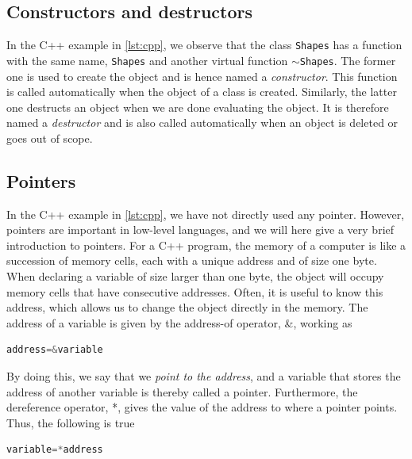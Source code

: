 \subsection{Constructors and destructors}
In the C++ example in \eqref{lst:cpp}, we observe that the class \texttt{Shapes} has a function with the same name, \texttt{Shapes} and another virtual function $\sim$\texttt{Shapes}. The former one is used to create the object and is hence named a \textit{constructor}. This function is called automatically when the object of a class is created. Similarly, the latter one destructs an object when we are done evaluating the object. It is therefore named a \textit{destructor} and is also called automatically when an object is deleted or goes out of scope.

\subsection{Pointers}
In the C++ example in \eqref{lst:cpp}, we have not directly used any pointer. However, pointers are important in low-level languages, and we will here give a very brief introduction to pointers. For a C++ program, the memory of a computer is like a succession of memory cells, each with a unique address and of size one byte. When declaring a variable of size larger than one byte, the object will occupy memory cells that have consecutive addresses. Often, it is useful to know this address, which allows us to change the object directly in the memory. The address of a variable is given by the address-of operator, \&, working as
\lstset{basicstyle=\scriptsize}
\begin{lstlisting}[language=C++]
address=&variable
\end{lstlisting}
By doing this, we say that we \textit{point to the address}, and a variable that stores the address of another variable is thereby called a pointer. Furthermore, the dereference operator, *, gives the value of the address to where a pointer points. Thus, the following is true
\begin{lstlisting}[language=C++]
variable=*address
\end{lstlisting}

